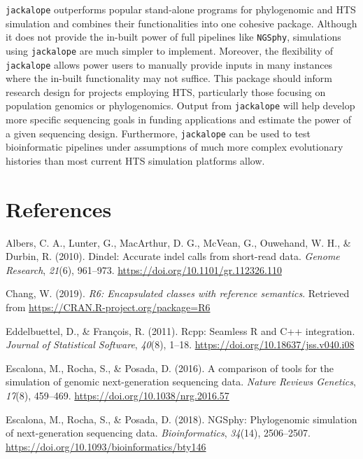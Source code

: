 \documentclass[12pt,]{article}
\begin{document}
\texttt{jackalope} outperforms popular stand-alone programs for phylogenomic and HTS
simulation and combines their functionalities into one cohesive package.
Although it does not provide the in-built power of full pipelines like \texttt{NGSphy},
simulations using \texttt{jackalope} are much simpler to implement.
Moreover, the flexibility of \texttt{jackalope} allows power users to manually
provide inputs in many instances where the in-built functionality may not suffice.
This package should inform research design for projects employing HTS,
particularly those focusing on population genomics or phylogenomics.
Output from \texttt{jackalope} will help develop more specific sequencing goals
in funding applications and estimate the power of a given sequencing design.
Furthermore, \texttt{jackalope} can be used to test bioinformatic pipelines under
assumptions of much more complex evolutionary histories than most current HTS
simulation platforms allow.

\hypertarget{references}{%
\section*{References}\label{references}}

\hypertarget{refs}{}
\leavevmode\hypertarget{ref-Albers_2010}{}%
Albers, C. A., Lunter, G., MacArthur, D. G., McVean, G., Ouwehand, W. H., \& Durbin, R. (2010). Dindel: Accurate indel calls from short-read data. \emph{Genome Research}, \emph{21}(6), 961--973. \url{https://doi.org/10.1101/gr.112326.110}

\leavevmode\hypertarget{ref-Chang_2019}{}%
Chang, W. (2019). \emph{R6: Encapsulated classes with reference semantics}. Retrieved from \url{https://CRAN.R-project.org/package=R6}

\leavevmode\hypertarget{ref-Eddelbuettel_2011}{}%
Eddelbuettel, D., \& François, R. (2011). Rcpp: Seamless R and C++ integration. \emph{Journal of Statistical Software}, \emph{40}(8), 1--18. \url{https://doi.org/10.18637/jss.v040.i08}

\leavevmode\hypertarget{ref-Escalona_2016}{}%
Escalona, M., Rocha, S., \& Posada, D. (2016). A comparison of tools for the simulation of genomic next-generation sequencing data. \emph{Nature Reviews Genetics}, \emph{17}(8), 459--469. \url{https://doi.org/10.1038/nrg.2016.57}

\leavevmode\hypertarget{ref-Escalona_2018}{}%
Escalona, M., Rocha, S., \& Posada, D. (2018). NGSphy: Phylogenomic simulation of next-generation sequencing data. \emph{Bioinformatics}, \emph{34}(14), 2506--2507. \url{https://doi.org/10.1093/bioinformatics/bty146}
\end{document}
